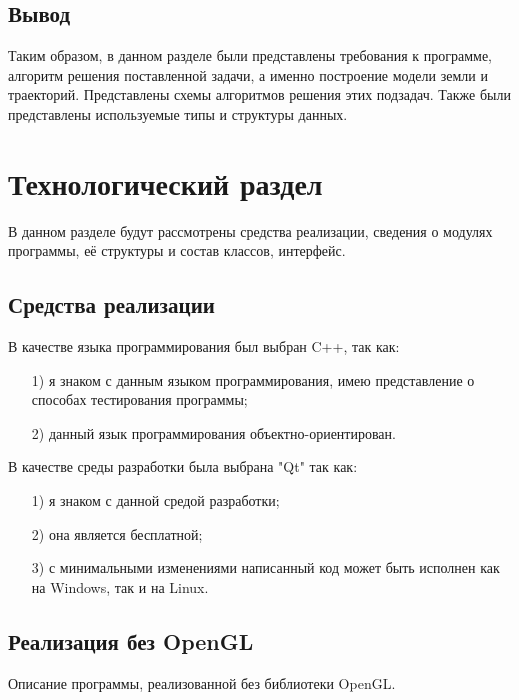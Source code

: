 \documentclass[14pt, a4paper]{extarticle}
\begin{document}
	\subsection*{Вывод}
	Таким образом, в данном разделе были представлены требования к программе, алгоритм решения поставленной задачи, а именно построение модели земли и траекторий. Представлены схемы алгоритмов решения этих подзадач. Также были представлены используемые типы и структуры данных.
 	\newpage
	
	\section{Технологический раздел}
	В данном разделе будут рассмотрены средства реализации, сведения о модулях
	программы, её структуры и состав классов, интерфейс.

	\subsection{Средства реализации}
	В качестве языка программирования был выбран C++, так как:
	
	\begin{itemize}
		\item[1)] я знаком с данным языком программирования, имею представление о
		способах тестирования программы;
		\item[2)] данный язык программирования объектно-ориентирован.		
	\end{itemize}
	
	В качестве среды разработки была выбрана "Qt" так как:
	\begin{itemize}
		\item[1)] я знаком с данной средой разработки;
		\item[2)] она является бесплатной;
		\item[3)] с минимальными изменениями написанный код	может быть исполнен как на Windows,
		 так и на Linux. 	
	\end{itemize}
	\newpage
	
	\subsection{Реализация без OpenGL}
	Описание программы, реализованной без библиотеки OpenGL.
\end{document}
